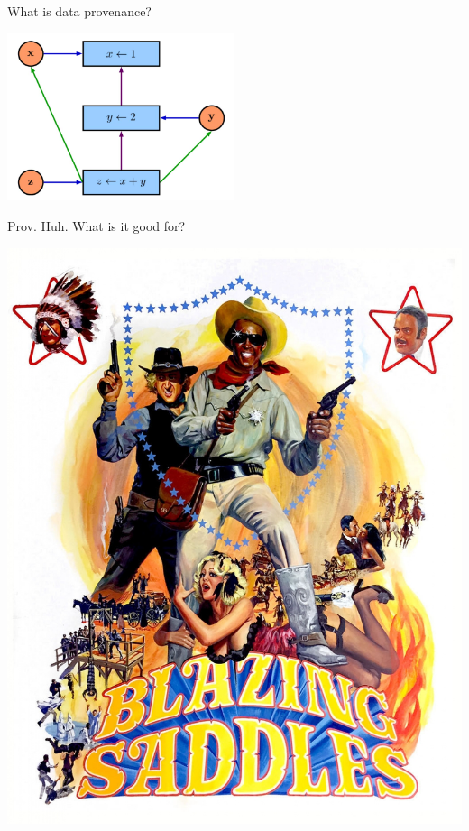 \documentclass[ignorenonframetext,]{beamer}
\begin{document}
\begin{frame}{What is data provenance?}
\protect\hypertarget{what-is-data-provenance-1}{}

\includegraphics[width=0.5\textwidth,height=\textheight]{provEx.png}

\end{frame}

\begin{frame}{Prov. Huh. What is it good for?}
\protect\hypertarget{prov.-huh.-what-is-it-good-for}{}

\includegraphics{blazing_saddles2.JPG}

\end{frame}
\end{document}
